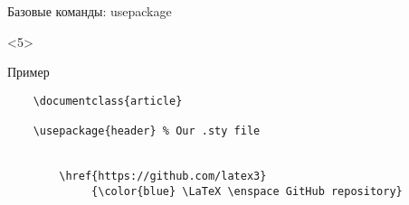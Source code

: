 \begin{frame}[fragile]{Базовые команды: usepackage}
\begin{onlyenv}<5>
    \begin{block}{Пример}
        \begin{lstlisting}
    \documentclass{article}
    
    \usepackage{header} % Our .sty file 
    
    
        \href{https://github.com/latex3}
             {\color{blue} \LaTeX \enspace GitHub repository}
    
        \end{lstlisting}
    \end{block}
\end{onlyenv}

\end{frame}